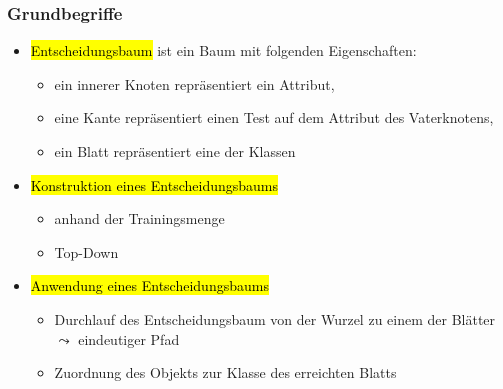 
\begin{frame}
\frametitle{Grundbegriffe}

\begin{itemize}
\item \hl{Entscheidungsbaum} ist ein Baum mit folgenden Eigenschaften:
\begin{itemize}
\item ein innerer Knoten repräsentiert ein Attribut,
\item eine Kante repräsentiert einen Test auf dem Attribut des Vaterknotens,
\item ein Blatt repräsentiert eine der Klassen
\end{itemize}
\item \hl{Konstruktion eines Entscheidungsbaums}
\begin{itemize}
\item anhand der Trainingsmenge 
\item Top-Down 
\end{itemize}
\item \hl{Anwendung eines Entscheidungsbaums}
\begin{itemize}
\item Durchlauf des Entscheidungsbaum von der Wurzel zu einem der
  Blätter $\leadsto$ eindeutiger Pfad  
 \item Zuordnung des Objekts zur Klasse des erreichten Blatts
\end{itemize}
\end{itemize}
\end{frame}



